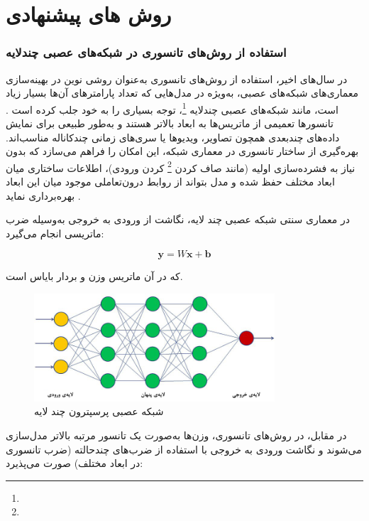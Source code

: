 \chapter{روش های پیشنهادی}



\subsection*{استفاده از روش‌های تانسوری در شبکه‌های عصبی چندلایه}

در سال‌های اخیر، استفاده از روش‌های تانسوری به‌عنوان روشی نوین در بهینه‌سازی معماری‌های شبکه‌های عصبی، به‌ویژه در مدل‌هایی که تعداد پارامترهای آن‌ها بسیار زیاد است، مانند شبکه‌های عصبی چندلایه \footnote{}، توجه بسیاری را به خود جلب کرده است \cite{novikov2015tensorizing}. تانسورها تعمیمی از ماتریس‌ها به ابعاد بالاتر هستند و به‌طور طبیعی برای نمایش داده‌های چندبعدی همچون تصاویر، ویدیوها یا سری‌های زمانی چندکاناله مناسب‌اند. بهره‌گیری از ساختار تانسوری در معماری شبکه، این امکان را فراهم می‌سازد که بدون نیاز به فشرده‌سازی اولیه (مانند صاف کردن \footnote{} کردن ورودی)، اطلاعات ساختاری میان ابعاد مختلف حفظ شده و مدل بتواند از روابط درون‌تعاملی موجود میان این ابعاد بهره‌برداری نماید \cite{novikov2015tensorizing}.

در معماری سنتی شبکه عصبی چند لایه، نگاشت از ورودی  به خروجی  به‌وسیله ضرب ماتریسی انجام می‌گیرد:

\[
\mathbf{y} = W\mathbf{x} + \mathbf{b}
\]

که در آن  ماتریس وزن و  بردار بایاس است.

\begin{figure}[h]
	\centering
	\includegraphics[width=0.8\textwidth]{transformer_images/persian images/b13.png}
	\caption{شبکه عصبی پرسپترون چند لایه}
	\label{fig:Mlp}
\end{figure}

در مقابل، در روش‌های تانسوری، وزن‌ها به‌صورت یک تانسور مرتبه بالاتر مدل‌سازی می‌شوند و نگاشت ورودی به خروجی با استفاده از ضرب‌های چندحالته (ضرب تانسوری در ابعاد مختلف) صورت می‌پذیرد:

